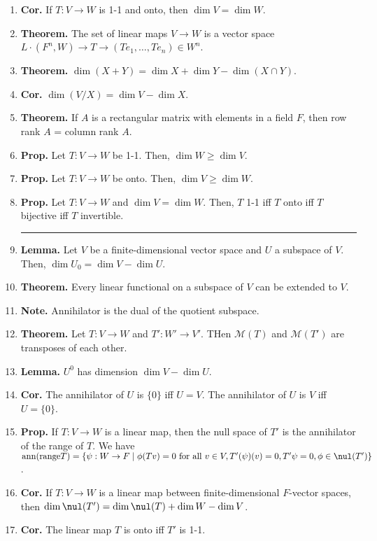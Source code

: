 \begin{enumerate}
	\item \textbf{Cor. } If $T: V \to W$ is 1-1 and onto, then $\dim V = \dim W$. 
	\item \textbf{Theorem. } The set of linear maps $V \to W$ is a vector space $L \cdot (F^n,W) \to T \longrightarrow (Te_1,\dots,Te_n) \in W^n$. 
	\item \textbf{Theorem. } $\dim (X+Y) = \dim X + \dim Y - \dim (X \cap Y)$. 
	\item \textbf{Cor. } $\dim (V/X) = \dim V - \dim X$. 
	\item \textbf{Theorem. } If $A$ is a rectangular matrix with elements in a field $F$, then row rank $A$ = column rank $A$. 
	\item \textbf{Prop. } Let $T: V \to W$ be 1-1. Then, $\dim W \geq \dim V$. 
	\item \textbf{Prop. } Let $T: V \to W$ be onto. Then, $\dim V \geq \dim W$. 
	\item \textbf{Prop. } Let $T: V \to W$ and $\dim V = \dim W$. Then, $T$ 1-1 iff $T$ onto iff $T$ bijective iff $T$ invertible. 
	\begin{center}
		\hrule
	\end{center}
	\item \textbf{Lemma. } Let $V$ be a finite-dimensional vector space and $U$ a subspace of $V$. Then, $\dim U_0 = \dim V - \dim U$. 
	\item \textbf{Theorem. } Every linear functional on a subspace of $V$ can be extended to $V$. 
	\item \textbf{Note. } Annihilator is the dual of the quotient subspace. 
	\item \textbf{Theorem. } Let $T: V \to W$ and $T': W' \to V'$. THen $\mathscr{M}(T)$ and $\mathscr{M}(T')$ are transposes of each other. 
	\item \textbf{Lemma. } $U^0$ has dimension $\dim V - \dim U$. 
	\item \textbf{Cor. } The annihilator of $U$ is $\{0\}$ iff $U = V$. The annihilator of $U$ is $V$ iff $U = \{0\}$. 
	\item \textbf{Prop. } If $T: V \to W$ is a linear map, then the null space of $T'$ is the annihilator of the range of $T$. We have $\textrm{ann}(\textrm{range}T) = \{\psi: W \to F \mid \phi(Tv)=0 \textrm{ for all } v \in V, T'(\psi)(v)=0, T'\psi = 0, \phi \in \nul(T')\}$. 
	\item \textbf{Cor. } If $T: V \to W$ is a linear map between finite-dimensional $F$-vector spaces, then $\dim \nul(T') = \dim \nul(T) + \dim W - \dim V$. 
	\item \textbf{Cor. } The linear map $T$ is onto iff $T'$ is 1-1. 

\end{enumerate}
